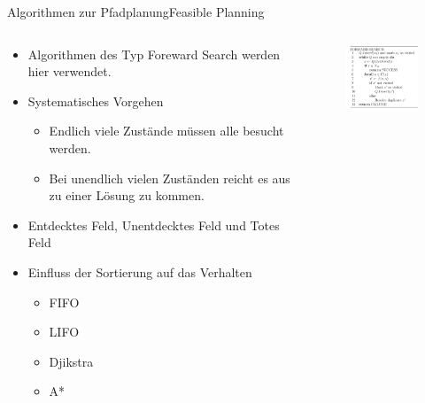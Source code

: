 \documentclass[t,aspectratio=169,dvipsnames]{beamer}
\begin{document}
\begin{frame}{Algorithmen zur Pfadplanung}{Feasible Planning}
	\begin{columns}
		\begin{column}[T]{0.7\textwidth}
			\begin{itemize}
				
				\item Algorithmen des Typ Foreward Search werden hier verwendet.
				\item Systematisches Vorgehen
				\begin{itemize} 
					\item Endlich viele Zustände müssen alle besucht werden. 
					\item Bei unendlich vielen Zuständen reicht es aus zu einer Lösung zu kommen. 
				\end{itemize}
				\item Entdecktes Feld, Unentdecktes Feld und Totes Feld
				\item Einfluss der Sortierung auf das Verhalten
				\begin{itemize}
					\item FIFO
					\item LIFO
				 	\item Djikstra
					\item A*
				\end{itemize}
			\end{itemize}
		\end{column}
		\begin{column}[T]{0.3\textwidth}
			\begin{figure}
				\includegraphics[width=4.5cm]{images/img225.png}
				\caption{} 
			\end{figure}
		\end{column}
	\end{columns}
\end{frame}
\end{document}
